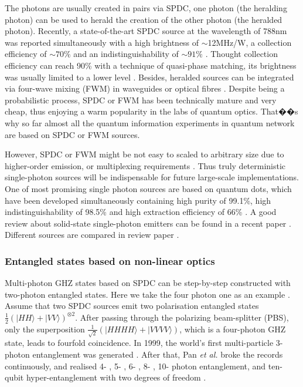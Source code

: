\documentclass[aps, rmp, twocolumn, amsmath, amssymb, nofootinbib, superscriptaddress, longbibliography, floatfix, table-of-contents, eqsecnum]{revtex4-1}
\newcommand{\ket}[1]{|#1\rangle}
\begin{document}
The photons are usually created in pairs via SPDC, one photon (the heralding photon) can be used to herald the creation of the other photon (the heralded photon). Recently, a state-of-the-art SPDC source at the wavelength of 788nm was reported simultaneously with a high brightness of $\sim$12MHz/W, a collection efficiency of $\sim 70\%$ and an indistinguishability of $\sim 91\%$ \cite{bib:tenPhotEnt}. Thought collection efficiency can reach 90\% with a technique of quasi-phase matching, its brightness was usually limited to a lower level \cite{giustina2013, christensen2013}. Besides, heralded sources can be integrated via four-wave mixing (FWM) in waveguides  \cite{silverstone2014, spring2016} or optical fibres  \cite{goldschmidt2008, smith2009}. Despite being a probabilistic process, SPDC or FWM has been technically mature and very cheap, thus enjoying a warm popularity in the labs of quantum optics. That��s why so far almost all the quantum information experiments in quantum network are based on SPDC or FWM sources.

However, SPDC or FWM might be not easy to scaled to arbitrary size due to higher-order emission, or multiplexing requirements \cite{bib:RohdeLoopMulti15}. Thus truly deterministic single-photon sources will be indispensable for future large-scale implementations. One of most promising single photon sources are based on quantum dots, which have been developed simultaneously containing high purity of 99.1\%, high indistinguishability of 98.5\% and high extraction efficiency of 66\% \cite{he2013on, wei2014de, ding2016on, somaschi2016, wang2016near, loredo2016}. A good review about solid-state single-photon emitters can be found in a recent paper  \cite{aharonovich2016solid}. Different sources are compared in review paper \cite{eisaman2011}.

%
%

\subsubsection{Entangled states based on non-linear optics} 

Multi-photon GHZ states based on SPDC \cite{kwiat1995new} can be step-by-step constructed with two-photon entangled states. Here we take the four photon one as an example \cite{pan2012multiphoton}. Assume that two SPDC sources emit two polarisation entangled states \mbox{$\frac{1}{2}(\ket{HH} + \ket{VV})^{\otimes 2}$}. After passing through the polarizing beam-splitter (PBS), only the superposition \mbox{$\frac{1}{\sqrt{2}}(\ket{HHHH} + \ket{VVVV})$}, which is a four-photon GHZ state, leads to fourfold coincidence. In 1999, the world's first multi-particle 3-photon entanglement was generated \cite{bouwmeester1999observation, pan2000experimental}. After that, Pan \textit{et al.} broke the records continuously, and realised 4- \cite{zhao2003experimental}, 5- \cite{zhao2004experimental}, 6- \cite{lu2007experimental}, 8- \cite{yao2012observation}, 10- \cite{bib:tenPhotEnt} photon entanglement, and ten-qubit hyper-entanglement with two degrees of freedom \cite{gao2010experimental}.
\end{document}

